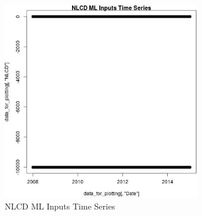 \begin{figure} 
\centering  
\includegraphics[width=0.77\textwidth]{Code_Outputs/ML_input_report_ML_input_PM25_Step5_part_d_de_duplicated_aves_ML_input_NLCDTS.jpg} 
\caption{\label{fig:ML_input_report_ML_input_PM25_Step5_part_d_de_duplicated_aves_ML_inputNLCDTS}NLCD ML Inputs Time Series} 
\end{figure} 
 
